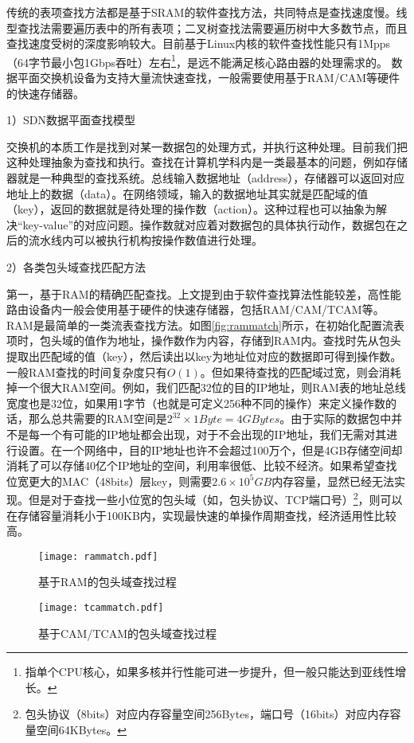 \label{chap242}
传统的表项查找方法都是基于SRAM的软件查找方法，共同特点是查找速度慢。线型查找法需要遍历表中的所有表项；二叉树查找法需要遍历树中大多数节点，而且查找速度受树的深度影响较大。目前基于Linux内核的软件查找性能只有1Mpps（64字节最小包1Gbps吞吐）左右\footnote{指单个CPU核心，如果多核并行性能可进一步提升，但一般只能达到亚线性增长。}，是远不能满足核心路由器的处理需求的。
数据平面交换机设备为支持大量流快速查找，一般需要使用基于RAM/CAM等硬件的快速存储器。

1）SDN数据平面查找模型

交换机的本质工作是找到对某一数据包的处理方式，并执行这种处理。目前我们把这种处理抽象为查找和执行。查找在计算机学科内是一类最基本的问题，例如存储器就是一种典型的查找系统。总线输入数据地址（address），存储器可以返回对应地址上的数据（data）。在网络领域，输入的数据地址其实就是匹配域的值（key），返回的数据就是待处理的操作数（action）。这种过程也可以抽象为解决“key-value”的对应问题。操作数就对应着对数据包的具体执行动作，数据包在之后的流水线内可以被执行机构按操作数值进行处理。

2）各类包头域查找匹配方法

第一，基于RAM的精确匹配查找。上文提到由于软件查找算法性能较差，高性能路由设备内一般会使用基于硬件的快速存储器，包括RAM/CAM/TCAM等。RAM是最简单的一类流表查找方法。如图\ref{fig:rammatch}所示，在初始化配置流表项时，包头域的值作为地址，操作数作为内容，存储到RAM内。查找时先从包头提取出匹配域的值（key），然后读出以key为地址位对应的数据即可得到操作数。一般RAM查找的时间复杂度只有$O(1)$。但如果待查找的匹配域过宽，则会消耗掉一个很大RAM空间。例如，我们匹配32位的目的IP地址，则RAM表的地址总线宽度也是32位，如果用1字节（也就是可定义256种不同的操作）来定义操作数的话，那么总共需要的RAM空间是$2^{32}\times 1Byte=4GBytes$。由于实际的数据包中并不是每一个有可能的IP地址都会出现，对于不会出现的IP地址，我们无需对其进行设置。在一个网络中，目的IP地址也许不会超过100万个，但是4GB存储空间却消耗了可以存储40亿个IP地址的空间，利用率很低、比较不经济。如果希望查找位宽更大的MAC（48bits）层key，则需要$2.6\times 10^{5}GB$内存容量，显然已经无法实现。但是对于查找一些小位宽的包头域（如，包头协议、TCP端口号）\footnote{包头协议（8bits）对应内存容量空间256Bytes，端口号（16bits）对应内存容量空间64KBytes。}，则可以在存储容量消耗小于100KB内，实现最快速的单操作周期查找，经济适用性比较高。

\begin{figure}[htbp]
	\centering 
	\vspace{-1.5mm}
	\begin{minipage}[t]{0.39\textwidth}
		\centering
		\texttt{[image: rammatch.pdf]}
		\caption{基于RAM的包头域查找过程} \label{fig:rammatch}
	\end{minipage}
	\begin{minipage}[t]{0.6\textwidth}
		\centering
		\texttt{[image: tcammatch.pdf]}%
		\caption{基于CAM/TCAM的包头域查找过程} \label{fig:tcammatch}
	\end{minipage}
\end{figure}

